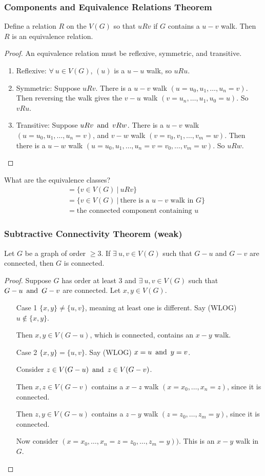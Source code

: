 \subsubsection*{Components and Equivalence Relations Theorem}
Define a relation $R$ on the $V(G)$ so that $uRv$ if $G$ contains a $u-v$ walk. Then $R$ is an equivalence relation.
\begin{proof}
    An equivalence relation must be reflexive, symmetric, and transitive.
    \begin{enumerate}
        \item Reflexive: $\forall~u \in V(G)$, $(u)$ is a $u-u$ walk, so $uRu$.
        \item Symmetric: Suppose $uRv$. There is a $u-v$ walk $(u=u_0, u_1, \ldots, u_n = v)$. Then reversing the walk gives the $v-u$ walk $(v=u_n, \ldots, u_1, u_0 = u)$. So $vRu$.
        \item Transitive: Suppose $uRv \operatorname{~\text{and}~} vRw$. There is a $u-v$ walk $(u=u_0, u_1, \ldots, u_n = v)$, and $v-w$ walk $(v=v_0, v_1, \ldots, v_m = w)$. Then there is a $u-w$ walk $(u=u_0, u_1, \ldots, u_n = v = v_0, \ldots, v_m = w)$. So $uRw$.
    \end{enumerate}
\end{proof}
What are the equivalence classes?
\begin{align*}
    [u] & = \{v \in V(G) ~|~ uRv\}                                 \\
        & = \{v \in V(G) ~|~ \text{there is a $u-v$ walk in $G$}\} \\
        & = \text{the connected component containing $u$}
\end{align*}

\subsubsection*{Subtractive Connectivity Theorem (weak)}
Let $G$ be a graph of order $\geq 3$. If $\exists~ u,v \in V(G)$ such that $G-u$ and $G-v$ are connected, then $G$ is connected.
\begin{proof}
    Suppose $G$ has order at least 3 and $\exists~ u,v \in V(G)$ such that $G-u \operatorname{~\text{and}~} G-v$ are connected. Let $x,y \in V(G)$.
    \begin{enumerate}
        \item[Case 1] $\{x,y\} \neq \{u,v\}$, meaning at least one is different. Say (WLOG) $u \notin \{x,y\}$.

            Then $x,y \in V(G-u)$, which is connected, contains an $x-y$ walk.
        \item[Case 2] $\{x,y\} = \{u,v\}$. Say (WLOG) $x=u \operatorname{~\text{and}~} y=v$.

            Consider $z \in V(G-u) \operatorname{~\text{and}~} z \in V(G-v)$.

            Then $x,z \in V(G-v)$ contains a $x-z$ walk $(x=x_0, \ldots, x_n = z)$, since it is connected.

            Then $z,y \in V(G-u)$ contains a $z-y$ walk $(z=z_0, \ldots, z_m = y)$, since it is connected.

            Now consider $(x=x_0, \ldots, x_n = z = z_0, \ldots, z_m = y))$. This is an $x-y$ walk in $G$.
    \end{enumerate}
\end{proof}

